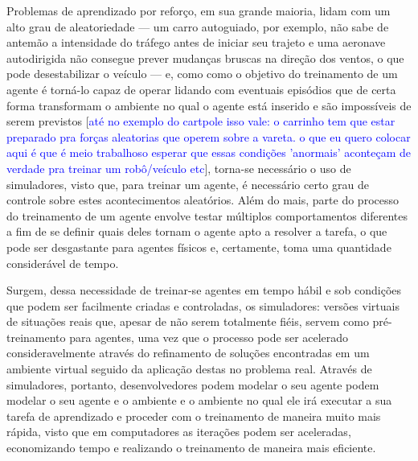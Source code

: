 \documentclass[cic,tc]{iiufrgs}
\newcommand\henrique[1]{\textcolor{blue}{#1}}
\begin{document}
%


Problemas de aprendizado por reforço, em sua grande maioria, lidam com um alto grau de aleatoriedade --- um carro autoguiado, por exemplo, não sabe de
antemão a intensidade do tráfego antes de iniciar seu trajeto e uma aeronave autodirigida não consegue prever mudanças bruscas na direção dos ventos, o que
pode desestabilizar o veículo --- e, como como o objetivo do treinamento de um agente é torná-lo capaz de operar lidando com eventuais episódios que de
certa forma transformam o ambiente no qual o agente está inserido e são impossíveis de serem previstos [\henrique{até no exemplo do cartpole isso vale:
o carrinho tem que estar preparado pra forças aleatorias que operem sobre a vareta.
o que eu quero colocar aqui é que é meio trabalhoso esperar que essas condições 'anormais' aconteçam de verdade pra treinar um robô/veículo etc}],
torna-se necessário o uso de simuladores, visto que, para treinar um agente, é necessário certo grau de controle sobre estes acontecimentos aleatórios.
Além do mais, parte do processo do treinamento de um agente envolve testar múltiplos comportamentos diferentes a fim de se definir quais deles tornam o
agente apto a resolver a tarefa, o que pode ser desgastante para agentes físicos e, certamente, toma uma quantidade considerável de tempo.


Surgem, dessa necessidade de treinar-se agentes em tempo hábil e sob condições que podem ser facilmente criadas e controladas, os simuladores: versões
virtuais de situações reais que, apesar de não serem totalmente fiéis, servem como pré-treinamento para agentes, uma vez que o processo pode ser
acelerado consideravelmente através do refinamento de soluções encontradas em um ambiente virtual seguido da aplicação destas no problema real. Através
de simuladores, portanto, desenvolvedores podem modelar o seu agente podem modelar o seu agente e o ambiente e o ambiente no qual ele irá executar
a sua tarefa de aprendizado e proceder com o treinamento de maneira muito mais rápida, visto que em computadores as iterações podem ser aceleradas,
economizando tempo e realizando o treinamento de maneira mais eficiente.
\end{document}
